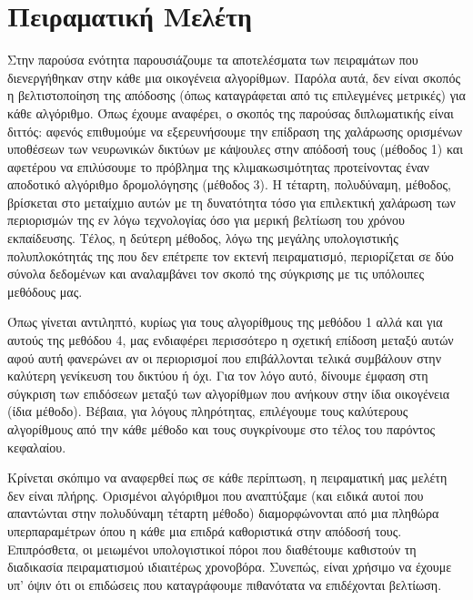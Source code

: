 \chapter{Πειραματική Μελέτη}

Στην παρούσα ενότητα παρουσιάζουμε τα αποτελέσματα των πειραμάτων που διενεργήθηκαν στην κάθε μια οικογένεια αλγορίθμων. Παρόλα αυτά, δεν είναι σκοπός η βελτιστοποίηση της απόδοσης (όπως καταγράφεται από τις επιλεγμένες μετρικές) για κάθε αλγόριθμο. Όπως έχουμε αναφέρει, ο σκοπός της παρούσας διπλωματικής είναι διττός: αφενός επιθυμούμε να εξερευνήσουμε την επίδραση της χαλάρωσης ορισμένων υποθέσεων των νευρωνικών δικτύων με κάψουλες στην απόδοσή τους (μέθοδος 1) και αφετέρου να επιλύσουμε το πρόβλημα της κλιμακωσιμότητας προτείνοντας έναν αποδοτικό αλγόριθμο δρομολόγησης (μέθοδος 3). Η τέταρτη, πολυδύναμη, μέθοδος, βρίσκεται στο μεταίχμιο αυτών με τη δυνατότητα τόσο για επιλεκτική χαλάρωση των περιορισμών της εν λόγω τεχνολογίας όσο για μερική βελτίωση του χρόνου εκπαίδευσης. Τέλος, η δεύτερη μέθοδος, λόγω της μεγάλης υπολογιστικής πολυπλοκότητάς της που δεν επέτρεπε τον εκτενή πειραματισμό, περιορίζεται σε δύο σύνολα δεδομένων και αναλαμβάνει τον σκοπό της σύγκρισης με τις υπόλοιπες μεθόδους μας.\par

Όπως γίνεται αντιληπτό, κυρίως για τους αλγορίθμους της μεθόδου 1 αλλά και για αυτούς της μεθόδου 4, μας ενδιαφέρει περισσότερο η σχετική επίδοση μεταξύ αυτών αφού αυτή φανερώνει αν οι περιορισμοί που επιβάλλονται τελικά συμβάλουν στην καλύτερη γενίκευση του δικτύου ή όχι. Για τον λόγο αυτό, δίνουμε έμφαση στη σύγκριση των επιδόσεων μεταξύ των αλγορίθμων που ανήκουν στην ίδια οικογένεια (ίδια μέθοδο). Βέβαια, για λόγους πληρότητας, επιλέγουμε τους καλύτερους αλγορίθμους από την κάθε μέθοδο και τους συγκρίνουμε στο τέλος του παρόντος κεφαλαίου.\par

Κρίνεται σκόπιμο να αναφερθεί πως σε κάθε περίπτωση, η πειραματική μας μελέτη δεν είναι πλήρης. Ορισμένοι αλγόριθμοι που αναπτύξαμε (και ειδικά αυτοί που απαντώνται στην πολυδύναμη τέταρτη μέθοδο) διαμορφώνονται από μια πληθώρα υπερπαραμέτρων όπου η κάθε μια επιδρά καθοριστικά στην απόδοσή τους. Επιπρόσθετα, οι μειωμένοι υπολογιστικοί πόροι που διαθέτουμε καθιστούν τη διαδικασία πειραματισμού ιδιαιτέρως χρονοβόρα. Συνεπώς, είναι χρήσιμο να έχουμε υπ' όψιν ότι οι επιδώσεις που καταγράφουμε πιθανότατα να επιδέχονται βελτίωση.\par

